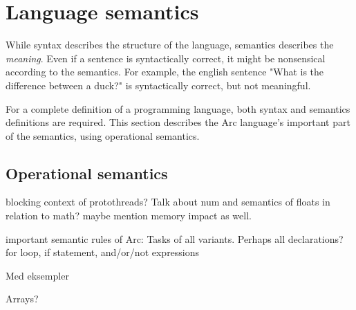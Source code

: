 \section{Language semantics}\label{sec:languagesemantics}
While syntax describes the structure of the language, semantics describes the \textit{meaning}. Even if a sentence is syntactically correct, it might be nonsensical according to the semantics. For example, the english sentence "What is the difference between a duck?" is syntactically correct, but not meaningful.

For a complete definition of a programming language, both syntax and semantics definitions are required. This section describes the Arc language's important part of the semantics, using operational semantics.




\subsection{Operational semantics}\label{subsec:operationalsemantics}

blocking context of protothreads?
Talk about num and semantics of floats in relation to math? maybe mention memory impact as well.

important semantic rules of Arc:
Tasks of all variants. Perhaps all declarations?
for loop, if statement, and/or/not expressions

Med eksempler

Arrays?


